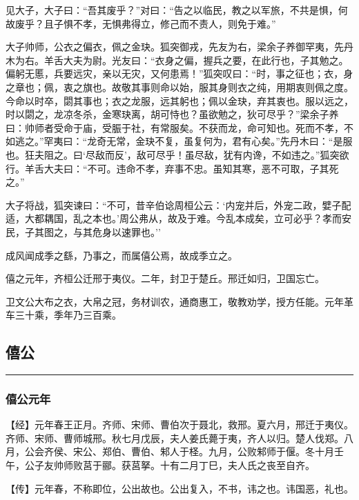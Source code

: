 \documentclass[]{article}
\begin{document}
见大子，大子曰：``吾其废乎？''对曰：``告之以临民，教之以军旅，不共是惧，何故废乎？且子惧不孝，无惧弗得立，修己而不责人，则免于难。''

大子帅师，公衣之偏衣，佩之金玦。狐突御戎，先友为右，梁余子养御罕夷，先丹木为右。羊舌大夫为尉。光友曰：``衣身之偏，握兵之要，在此行也，子其勉之。偏躬无慝，兵要远灾，亲以无灾，又何患焉！''狐突叹曰：``时，事之征也；衣，身之章也；佩，衷之旗也。故敬其事则命以始，服其身则衣之纯，用期衷则佩之度。今命以时卒，閟其事也；衣之龙服，远其躬也；佩以金玦，弃其衷也。服以远之，时以閟之，龙凉冬杀，金寒玦离，胡可恃也？虽欲勉之，狄可尽乎？''梁余子养曰：帅师者受命于庙，受脤于社，有常服矣。不获而龙，命可知也。死而不孝，不如逃之。''罕夷曰：``龙奇无常，金玦不复，虽复何为，君有心矣。''先丹木曰：``是服也。狂夫阻之。曰`尽敌而反'，敌可尽乎！虽尽敌，犹有内谗，不如违之。''狐突欲行。羊舌大夫曰：``不可。违命不孝，弃事不忠。虽知其寒，恶不可取，子其死之。''

大子将战，狐突谏曰：``不可，昔辛伯谂周桓公云：`内宠并后，外宠二政，嬖子配适，大都耦国，乱之本也。'周公弗从，故及于难。今乱本成矣，立可必乎？孝而安民，子其图之，与其危身以速罪也。''

成风闻成季之繇，乃事之，而属僖公焉，故成季立之。

僖之元年，齐桓公迁邢于夷仪。二年，封卫于楚丘。邢迁如归，卫国忘亡。

卫文公大布之衣，大帛之冠，务材训农，通商惠工，敬教劝学，授方任能。元年革车三十乘，季年乃三百乘。

\hypertarget{header-n646}{%
\subsection{僖公}\label{header-n646}}

\begin{center}\rule{0.5\linewidth}{\linethickness}\end{center}

\hypertarget{header-n648}{%
\subsubsection{僖公元年}\label{header-n648}}

【经】元年春王正月。齐师、宋师、曹伯次于聂北，救邢。夏六月，邢迁于夷仪。齐师、宋师、曹师城邢。秋七月戊辰，夫人姜氏薨于夷，齐人以归。楚人伐郑。八月，公会齐侯、宋公、郑伯、曹伯、邾人于柽。九月，公败邾师于偃。冬十月壬午，公子友帅师败莒于郦。获莒拏。十有二月丁巳，夫人氏之丧至自齐。

【传】元年春，不称即位，公出故也。公出复入，不书，讳之也。讳国恶，礼也。
\end{document}
